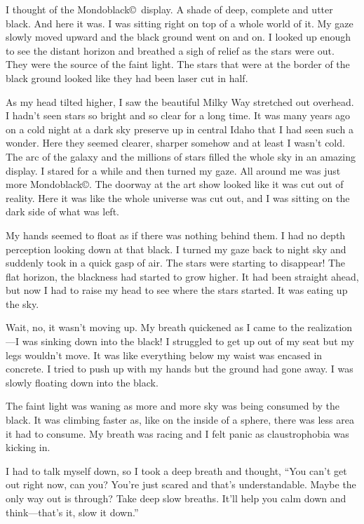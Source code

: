 I thought of the Mondoblack\copyright\ display. A shade of deep,
complete and utter black. And here it was. I was sitting right
on top of a whole world of it. My gaze slowly moved upward and
the black ground went on and on. I looked up enough to see the
distant horizon and breathed a sigh of relief as the stars were
out.  They were the source of the faint light. The stars that
were at the border of the black ground looked like they had been
laser cut in half.

As my head tilted higher, I saw the beautiful Milky Way
stretched out overhead. I hadn't seen stars so bright and so
clear for a long time.  It was many years ago on a cold night at
a dark sky preserve up in central Idaho that I had seen such a
wonder. Here they seemed clearer, sharper somehow and at least I
wasn't cold.  The arc of the galaxy and the millions of stars
filled the whole sky in an amazing display. I stared for a while
and then turned my gaze.  All around me was just more
Mondoblack\copyright.  The doorway at the art show looked like
it was cut out of reality. Here it was like the whole
universe was cut out, and I was sitting on the dark side of what
was left.

My hands seemed to float as if there was nothing behind them.  I
had no depth perception looking down at that black.  I turned my
gaze back to night sky and suddenly took in a quick gasp of air.
The stars were starting to disappear! The flat horizon, the
blackness had started to grow higher.  It had been
straight ahead, but now I had to raise my head to see
where the stars started. It was eating up the sky.

Wait, no, it wasn't moving up. My breath quickened as I came to
the realization---I was sinking down into the black!  I
struggled to get up out of my seat but my legs wouldn't move. It
was like everything below my waist was encased in concrete. I
tried to push up with my hands but the ground had gone away. I
was slowly floating down into the black.

The faint light was waning as more and more sky was being
consumed by the black. It was climbing faster as, like on the
inside of a sphere, there was less area it had to consume. My
breath was racing and I felt panic as claustrophobia was kicking
in.

I had to talk myself down, so I took a deep breath and thought,
``You can't get out right now, can you? You're just
scared and that's understandable.  Maybe the only way out is
through? Take deep slow breaths. It'll help you calm down and
think---that's it, slow it down.''

